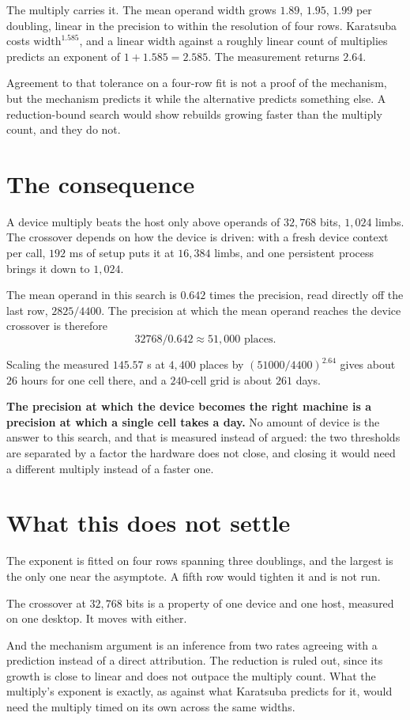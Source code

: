 The multiply carries it. The mean operand width grows \(1.89\), \(1.95\), \(1.99\) per doubling, linear
in the precision to within the resolution of four rows. Karatsuba costs \(\mathrm{width}^{1.585}\), and
a linear width against a roughly linear count of multiplies predicts an exponent of
\(1 + 1.585 = 2.585\). The measurement returns \(2.64\).

Agreement to that tolerance on a four-row fit is not a proof of the mechanism, but the mechanism
predicts it while the alternative predicts something else. A reduction-bound search would show
rebuilds growing faster than the multiply count, and they do not.

\section{The consequence}

A device multiply beats the host only above operands of \(32{,}768\) bits, \(1{,}024\) limbs. The
crossover depends on how the device is driven: with a fresh device context per call, \(192\) ms of
setup puts it at \(16{,}384\) limbs, and one persistent process brings it down to \(1{,}024\).

The mean operand in this search is \(0.642\) times the precision, read directly off the last row,
\(2825/4400\). The precision at which the mean operand reaches the device crossover is therefore
\[
32768 / 0.642 \approx 51{,}000 \text{ places}.
\]

Scaling the measured \(145.57\) s at \(4{,}400\) places by \((51000/4400)^{2.64}\) gives about \(26\)
hours for one cell there, and a \(240\)-cell grid is about \(261\) days.

\textbf{The precision at which the device becomes the right machine is a precision at which a single
cell takes a day.} No amount of device is the answer to this search, and that is measured instead of
argued: the two thresholds are separated by a factor the hardware does not close, and closing it would
need a different multiply instead of a faster one.

\section{What this does not settle}

The exponent is fitted on four rows spanning three doublings, and the largest is the only one near
the asymptote. A fifth row would tighten it and is not run.

The crossover at \(32{,}768\) bits is a property of one device and one host, measured on one desktop.
It moves with either.

And the mechanism argument is an inference from two rates agreeing with a prediction instead of a direct
attribution. The reduction is ruled out, since its growth is close to linear and does not outpace the
multiply count. What the multiply's exponent is exactly, as against what Karatsuba predicts for it,
would need the multiply timed on its own across the same widths.
